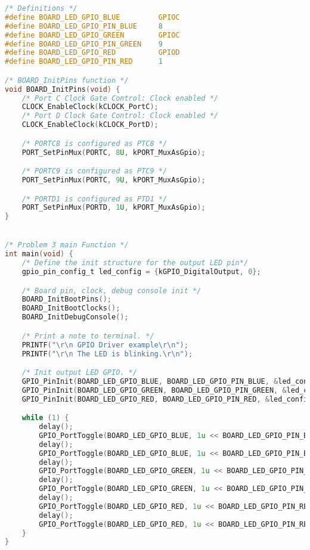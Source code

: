 \begin{lstlisting}[language=c,caption=Problem 3, label=list:p3]
/* Definitions */
#define BOARD_LED_GPIO_BLUE         GPIOC
#define BOARD_LED_GPIO_PIN_BLUE     8
#define BOARD_LED_GPIO_GREEN        GPIOC
#define BOARD_LED_GPIO_PIN_GREEN    9
#define BOARD_LED_GPIO_RED          GPIOD
#define BOARD_LED_GPIO_PIN_RED      1

/* BOARD_InitPins function */
void BOARD_InitPins(void) {
    /* Port C Clock Gate Control: Clock enabled */
    CLOCK_EnableClock(kCLOCK_PortC);
    /* Port D Clock Gate Control: Clock enabled */
    CLOCK_EnableClock(kCLOCK_PortD);

    /* PORTC8 is configured as PTC8 */
    PORT_SetPinMux(PORTC, 8U, kPORT_MuxAsGpio);

    /* PORTC9 is configured as PTC9 */
    PORT_SetPinMux(PORTC, 9U, kPORT_MuxAsGpio);

    /* PORTD1 is configured as PTD1 */
    PORT_SetPinMux(PORTD, 1U, kPORT_MuxAsGpio);
}


/* Problem 3 main Function */
int main(void) {
    /* Define the init structure for the output LED pin*/
    gpio_pin_config_t led_config = {kGPIO_DigitalOutput, 0};

    /* Board pin, clock, debug console init */
    BOARD_InitBootPins();
    BOARD_InitBootClocks();
    BOARD_InitDebugConsole();

    /* Print a note to terminal. */
    PRINTF("\r\n GPIO Driver example\r\n");
    PRINTF("\r\n The LED is blinking.\r\n");

    /* Init output LED GPIO. */
    GPIO_PinInit(BOARD_LED_GPIO_BLUE, BOARD_LED_GPIO_PIN_BLUE, &led_config);
    GPIO_PinInit(BOARD_LED_GPIO_GREEN, BOARD_LED_GPIO_PIN_GREEN, &led_config);
    GPIO_PinInit(BOARD_LED_GPIO_RED, BOARD_LED_GPIO_PIN_RED, &led_config);

    while (1) {
        delay();
        GPIO_PortToggle(BOARD_LED_GPIO_BLUE, 1u << BOARD_LED_GPIO_PIN_BLUE);
        delay();
        GPIO_PortToggle(BOARD_LED_GPIO_BLUE, 1u << BOARD_LED_GPIO_PIN_BLUE);
        delay();
        GPIO_PortToggle(BOARD_LED_GPIO_GREEN, 1u << BOARD_LED_GPIO_PIN_GREEN);
        delay();
        GPIO_PortToggle(BOARD_LED_GPIO_GREEN, 1u << BOARD_LED_GPIO_PIN_GREEN);
        delay();
        GPIO_PortToggle(BOARD_LED_GPIO_RED, 1u << BOARD_LED_GPIO_PIN_RED);
        delay();
        GPIO_PortToggle(BOARD_LED_GPIO_RED, 1u << BOARD_LED_GPIO_PIN_RED);
    }
}
\end{lstlisting}